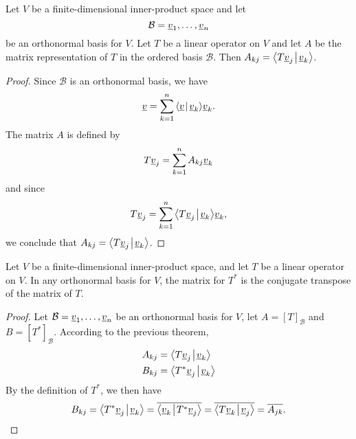 \begin{theorem}
Let $V$ be a finite-dimensional inner-product space and let
\begin{equation*}
\mathcal{B} = \underline{v}_1, \ldots, \underline{v}_n
\end{equation*}
be an orthonormal basis for $V$.
Let $T$ be a linear operator on $V$ and let $A$ be the matrix representation of $T$ in the ordered basis $\mathcal{B}$.
Then $A_{kj} = {\left\langle  T \underline{v}_j  \mskip2mu \middle| \mskip2mu  \underline{v}_k  \right\rangle}$.
\end{theorem}
\begin{proof}
Since $\mathcal{B}$ is an orthonormal basis, we have
\begin{equation*}
\underline{v} = \sum_{k=1}^n {\left\langle  \underline{v}  \mskip2mu \middle| \mskip2mu  \underline{v}_k  \right\rangle} \underline{v}_k .
\end{equation*}
The matrix $A$ is defined by
\begin{equation*}
T \underline{v}_j = \sum_{k=1}^n A_{kj} \underline{v}_k
\end{equation*}
and since
\begin{equation*}
T \underline{v}_j = \sum_{k=1}^n {\left\langle  T \underline{v}_j  \mskip2mu \middle| \mskip2mu  \underline{v}_k  \right\rangle} \underline{v}_k ,
\end{equation*}
we conclude that $A_{kj} = {\left\langle  T \underline{v}_j  \mskip2mu \middle| \mskip2mu  \underline{v}_k  \right\rangle}$.
\end{proof}

\begin{corollary}
Let $V$ be a finite-dimensional inner-product space, and let $T$ be a linear operator on $V$.
In any orthonormal basis for $V$, the matrix for $T^*$ is the conjugate transpose of the matrix of $T$.
\end{corollary}
\begin{proof}
Let $\mathcal{B} = \underline{v}_1, \ldots, \underline{v}_n$ be an orthonormal basis for $V$, let $A = [T]_{\mathcal{B}}$ and $B = [T^*]_{\mathcal{B}}$.
According to the previous theorem,
\begin{align*}
A_{kj} &= {\left\langle  T \underline{v}_j  \mskip2mu \middle| \mskip2mu  \underline{v}_k  \right\rangle} \\
B_{kj} &= {\left\langle  T^* \underline{v}_j  \mskip2mu \middle| \mskip2mu  \underline{v}_k  \right\rangle}
\end{align*}
By the definition of $T^*$, we then have
\begin{equation*}
B_{kj} = {\left\langle  T^* \underline{v}_j  \mskip2mu \middle| \mskip2mu  \underline{v}_k  \right\rangle}
= \overline{{\left\langle  \underline{v}_k  \mskip2mu \middle| \mskip2mu  T^* \underline{v}_j  \right\rangle}}
= \overline{{\left\langle  T \underline{v}_k  \mskip2mu \middle| \mskip2mu  \underline{v}_j  \right\rangle}}
= \overline{A_{jk}} .
\end{equation*}
\end{proof}

